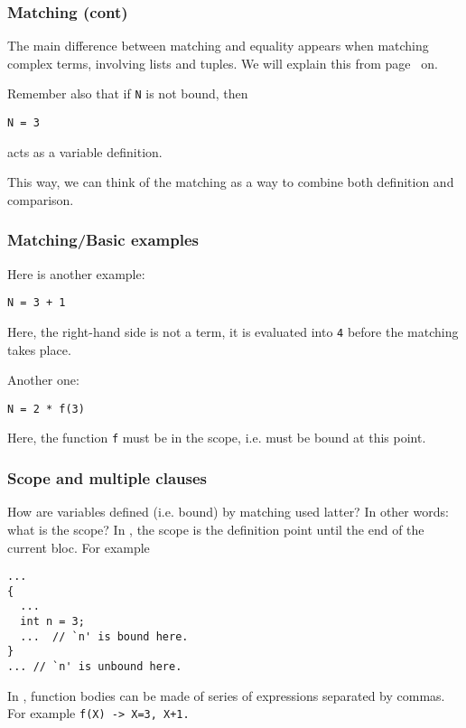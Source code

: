 %
\begin{frame}[containsverbatim]
\frametitle{Matching (cont)}

The main difference between matching and equality appears when
matching complex terms, involving lists and tuples. We will explain
this from page~\pageref{tuple_matching} on.

\bigskip

Remember also that if \texttt{N} is not bound, then 
\begin{verbatim}
N = 3
\end{verbatim}
acts as a variable definition.

\bigskip

This way, we can think of the matching as a way to combine both
definition and comparison.

\end{frame}

%
\begin{frame}[containsverbatim]
\frametitle{Matching/Basic examples}

Here is another example:
\begin{verbatim}
N = 3 + 1
\end{verbatim}
Here, the right-hand side is not a term, it is evaluated into
\texttt{4} before the matching takes place.

\bigskip

Another one:
\begin{verbatim}
N = 2 * f(3)
\end{verbatim}
Here, the function \texttt{f} must be in the scope, i.e. must be
bound at this point.

\end{frame}

%
\begin{frame}[containsverbatim]
\frametitle{Scope and multiple clauses}

\label{scope}

How are variables defined (i.e. bound) by matching used latter? In
other words: what is the scope? In \cpp, the scope is the definition
point until the end of the current bloc. For example 
\begin{verbatim}
...
{ 
  ...
  int n = 3;
  ...  // `n' is bound here.
}
... // `n' is unbound here.
\end{verbatim}
In \Erlang, function bodies can be made of series of expressions
separated by commas. For example \verb|f(X) -> X=3, X+1.|

\end{frame}

